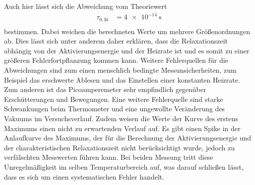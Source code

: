  
Auch hier lässt sich die Abweichung vom Theoriewert\cite{RMucillo} 
\begin{align*}
    \tau_{0,\text{lit}}&= \qty{4e-14}{\second}\\
\end{align*}
bestimmen. Dabei weichen die berechneten Werte um mehrere
Größenordnungen ab. Dies lässt sich unter anderem daher erklären, dass die Relaxationszeit abhängig von
der Aktivierungsenergie und der Heizrate ist und es somit zu einer größeren Fehlerfortpflanzung kommen kann.
Weitere Fehlerquellen für die Abweichungen sind zum einen menschlich bedingte Messunsicherheiten, zum Beispiel
das erschwerte Ablesen und das Einstellen einer konstanten Heizrate. Zum anderen ist das Picoamperemeter
sehr empfindlich gegenüber Erschütterungen und Bewegungen.
Eine weitere Fehlerquelle sind starke Schwankungen beim Thermometer und eine ungewollte Veränderung 
des Vakuums im Versuchsverlauf. Zudem weisen die Werte der Kurve des erstens Maximums einen nicht zu erwartenden Verlauf auf.
Es gibt einen Spike in der Anlaufkurve des Maximums, der für die Berechnung der Aktivierungsenergie und der
charakteristischen Relaxationszeit nicht berücksichtigt wurde, jedoch zu verfälschten Messwerten führen kann.
Bei beiden Messung tritt diese Unregelmäßigkeit im selben Temperaturbereich auf, was darauf schließen lässt,
dass es sich um einen systematischen Fehler handelt.